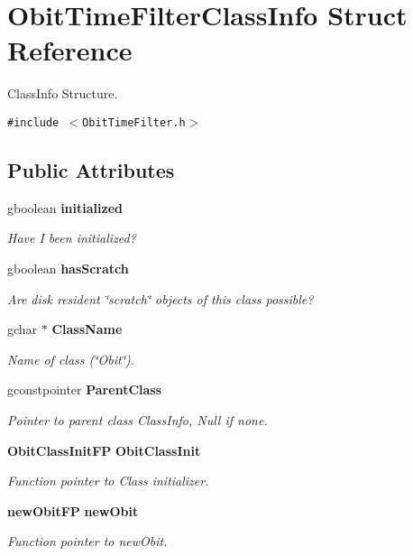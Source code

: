 \section{Obit\-Time\-Filter\-Class\-Info Struct Reference}
\label{structObitTimeFilterClassInfo}
Class\-Info Structure.  


{\tt \#include $<$Obit\-Time\-Filter.h$>$}

\subsection*{Public Attributes}
\begin{CompactItemize}
\item 
gboolean {\bf initialized}
\begin{CompactList}\small\item\em Have I been initialized? \item\end{CompactList}\item 
gboolean {\bf has\-Scratch}
\begin{CompactList}\small\item\em Are disk resident \char`\"{}scratch\char`\"{} objects of this class possible? \item\end{CompactList}\item 
gchar $\ast$ {\bf Class\-Name}
\begin{CompactList}\small\item\em Name of class (\char`\"{}Obit\char`\"{}). \item\end{CompactList}\item 
gconstpointer {\bf Parent\-Class}
\begin{CompactList}\small\item\em Pointer to parent class Class\-Info, Null if none. \item\end{CompactList}\item 
{\bf Obit\-Class\-Init\-FP} {\bf Obit\-Class\-Init}
\begin{CompactList}\small\item\em Function pointer to Class initializer. \item\end{CompactList}\item 
{\bf new\-Obit\-FP} {\bf new\-Obit}
\begin{CompactList}\small\item\em Function pointer to new\-Obit. \item\end{CompactList}\item 

\end{CompactItemize}
